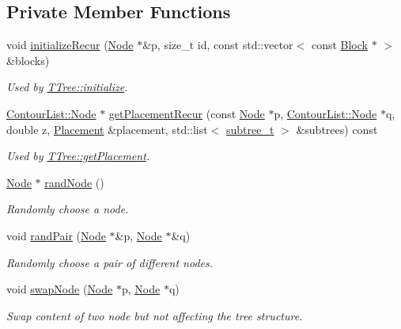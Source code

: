\subsection*{Private Member Functions}
\begin{DoxyCompactItemize}
\item 
void \hyperlink{classTTree_aa4a9d2b247a7f9c33d1834fd23de7cca}{initialize\+Recur} (\hyperlink{classTTree_1_1Node}{Node} $\ast$\&p, size\+\_\+t id, const std\+::vector$<$ const \hyperlink{structBlock}{Block} $\ast$ $>$ \&blocks)
\begin{DoxyCompactList}\small\item\em Used by \hyperlink{classTTree_a7be152bf003a3b7a41a0d2f2b8a60dcb}{T\+Tree\+::initialize}. \end{DoxyCompactList}\item 
\hyperlink{structContourList_1_1Node}{Contour\+List\+::\+Node} $\ast$ \hyperlink{classTTree_a99a5f5452d13f1a3e4b74f8275224beb}{get\+Placement\+Recur} (const \hyperlink{classTTree_1_1Node}{Node} $\ast$p, \hyperlink{structContourList_1_1Node}{Contour\+List\+::\+Node} $\ast$q, double z, \hyperlink{classPlacement}{Placement} \&placement, std\+::list$<$ \hyperlink{structTTree_1_1subtree__t}{subtree\+\_\+t} $>$ \&subtrees) const 
\begin{DoxyCompactList}\small\item\em Used by \hyperlink{classTTree_a7e34e70567be7961d4a5683010746aae}{T\+Tree\+::get\+Placement}. \end{DoxyCompactList}\item 
\hyperlink{classTTree_1_1Node}{Node} $\ast$ \hyperlink{classTTree_acd9ed57c09bb59a5fcf618b8e215d584}{rand\+Node} ()
\begin{DoxyCompactList}\small\item\em Randomly choose a node. \end{DoxyCompactList}\item 
void \hyperlink{classTTree_aa756d0b900bc757b8095993d86fa5bd9}{rand\+Pair} (\hyperlink{classTTree_1_1Node}{Node} $\ast$\&p, \hyperlink{classTTree_1_1Node}{Node} $\ast$\&q)
\begin{DoxyCompactList}\small\item\em Randomly choose a pair of different nodes. \end{DoxyCompactList}\item 
void \hyperlink{classTTree_adbb05d027840467cdce8b9489bc49225}{swap\+Node} (\hyperlink{classTTree_1_1Node}{Node} $\ast$p, \hyperlink{classTTree_1_1Node}{Node} $\ast$q)
\begin{DoxyCompactList}\small\item\em Swap content of two node but not affecting the tree structure. \end{DoxyCompactList}\item 

\end{DoxyCompactItemize}

